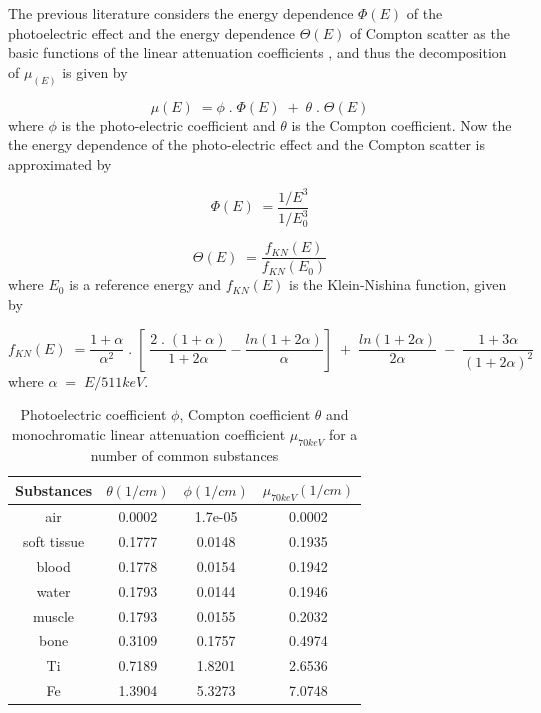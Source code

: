 The previous literature considers the energy dependence $\Phi(E)$ of the photoelectric effect and the energy dependence $\Theta(E)$ of Compton scatter as the basic functions of the linear attenuation coefficients \cite{avrin1978clinical}, and thus the decomposition of $\mu_(E)$ is given by 

\begin{equation}
\label{eq7}
\mu(E) \; = \phi \; . \; \Phi(E) \; + \; \theta \; . \; \Theta(E)
\end{equation} where $\phi$ is the photo-electric coefficient and $\theta$ is the Compton coefficient. Now the the energy dependence of the photo-electric effect and the Compton scatter is approximated by

\begin{equation}
\label{eq8}
\Phi(E) \; = \frac{1/E^{3}}{1/E_{0}^{3}}
\end{equation}

\begin{equation}
\label{eq9}
\Theta(E) \; = \frac{f_{KN}(E)}{f_{KN}(E_{0})}
\end{equation} where $E_{0}$ is a reference energy and $f_{KN}(E)$ is the Klein-Nishina function, given by

\begin{equation}
\label{eq10}
f_{KN}(E) \; = \frac{1 + \alpha}{\alpha^{2}} \; . \; \left[ \; \frac{2 \; . \; (1 + \alpha)}{1 + 2\alpha} - \frac{ln(1 + 2\alpha)}{\alpha} \right] \; + \; \frac{ln(1 + 2\alpha)}{2\alpha} \; - \; \frac{1 + 3\alpha}{(1 + 2\alpha)^{2}}
\end{equation} where $\alpha \; = \; E/511 keV$.

\begin{table}[]
\centering
 \begin{tabular}{|c|c|c|c|} 
 \hline
 Substances & $\theta (1/cm)$ & $\phi (1/cm)$ & $\mu_{70keV} (1/cm)$ \\ \hline
 air & 0.0002  & 1.7e-05 & 0.0002 \\  \hline
 soft tissue & 0.1777  & 0.0148 & 0.1935 \\ \hline
 blood & 0.1778  & 0.0154 & 0.1942 \\  \hline
 water & 0.1793  & 0.0144 & 0.1946 \\  \hline
 muscle & 0.1793 & 0.0155 & 0.2032 \\ \hline
 bone & 0.3109  & 0.1757 & 0.4974 \\  \hline
 Ti & 0.7189  & 1.8201 & 2.6536 \\  \hline
 Fe & 1.3904  & 5.3273 & 7.0748 \\  \hline
\end{tabular}
\caption{Photoelectric coefficient $\phi$, Compton coefficient $\theta$ and monochromatic linear attenuation coefficient $\mu_{70keV}$ for a number of common substances}
\label{table1}
\end{table}

